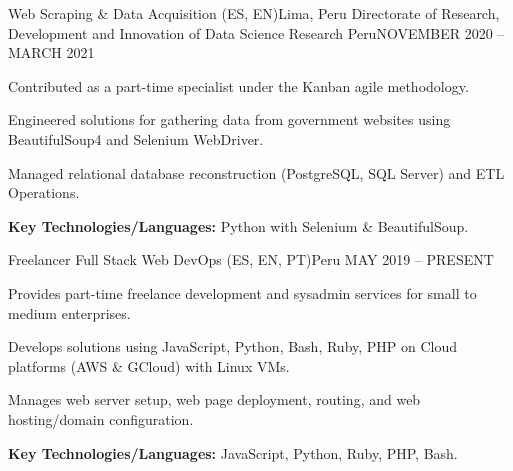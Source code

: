 \resumeSubheading
  {Web Scraping \& Data Acquisition (ES, EN)}{Lima, Peru}
  {Directorate of Research, Development and Innovation of Data Science Research Peru}{NOVEMBER 2020 -- MARCH 2021}
\resumeItemListStart
    \item Contributed as a part-time specialist under the Kanban agile methodology.
    \item Engineered solutions for gathering data from government websites using BeautifulSoup4 and Selenium WebDriver.
    \item Managed relational database reconstruction (PostgreSQL, SQL Server) and ETL Operations.
    \item \textbf{Key Technologies/Languages:} Python with Selenium \& BeautifulSoup.
\resumeItemListEnd

\resumeSubheading
  {Freelancer Full Stack Web DevOps (ES, EN, PT)}{Peru} %
  {}{MAY 2019 -- PRESENT} %
\resumeItemListStart
    \item Provides part-time freelance development and sysadmin services for small to medium enterprises.
    \item Develops solutions using JavaScript, Python, Bash, Ruby, PHP on Cloud platforms (AWS \& GCloud) with Linux VMs.
    \item Manages web server setup, web page deployment, routing, and web hosting/domain configuration.
    \item \textbf{Key Technologies/Languages:} JavaScript, Python, Ruby, PHP, Bash.
\resumeItemListEnd